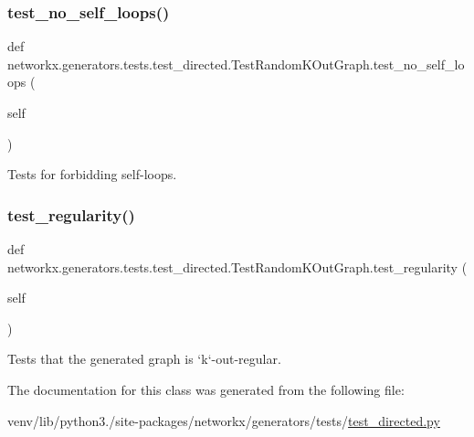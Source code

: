 \subsubsection{\texorpdfstring{test\+\_\+no\+\_\+self\+\_\+loops()}{test\_no\_self\_loops()}}
{\footnotesize\ttfamily def networkx.\+generators.\+tests.\+test\+\_\+directed.\+Test\+Random\+K\+Out\+Graph.\+test\+\_\+no\+\_\+self\+\_\+loops (\begin{DoxyParamCaption}\item[{}]{self }\end{DoxyParamCaption})}

\begin{DoxyVerb}Tests for forbidding self-loops.\end{DoxyVerb}
 \mbox{\label{classnetworkx_1_1generators_1_1tests_1_1test__directed_1_1TestRandomKOutGraph_a12923761e98287f44bddb8eaa96e5865}} 
\subsubsection{\texorpdfstring{test\+\_\+regularity()}{test\_regularity()}}
{\footnotesize\ttfamily def networkx.\+generators.\+tests.\+test\+\_\+directed.\+Test\+Random\+K\+Out\+Graph.\+test\+\_\+regularity (\begin{DoxyParamCaption}\item[{}]{self }\end{DoxyParamCaption})}

\begin{DoxyVerb}Tests that the generated graph is `k`-out-regular.\end{DoxyVerb}
 

The documentation for this class was generated from the following file\+:\begin{DoxyCompactItemize}
\item 
venv/lib/python3./site-\/packages/networkx/generators/tests/\hyperlink{test__directed_8py}{test\+\_\+directed.\+py}\end{DoxyCompactItemize}
